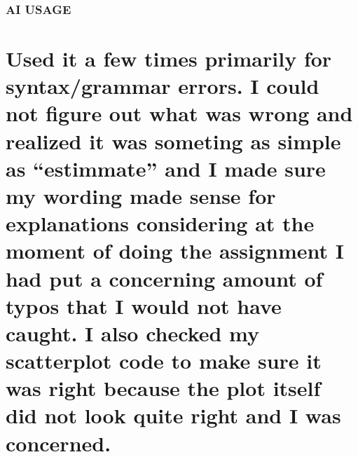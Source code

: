 \documentclass[
]{article}
\begin{document}
\subsubsection{AI USAGE}\label{ai-usage}

\section{Used it a few times primarily for syntax/grammar errors. I
could not figure out what was wrong and realized it was someting as
simple as ``estimmate'' and I made sure my wording made sense for
explanations considering at the moment of doing the assignment I had put
a concerning amount of typos that I would not have caught. I also
checked my scatterplot code to make sure it was right because the plot
itself did not look quite right and I was
concerned.}\label{used-it-a-few-times-primarily-for-syntaxgrammar-errors.-i-could-not-figure-out-what-was-wrong-and-realized-it-was-someting-as-simple-as-estimmate-and-i-made-sure-my-wording-made-sense-for-explanations-considering-at-the-moment-of-doing-the-assignment-i-had-put-a-concerning-amount-of-typos-that-i-would-not-have-caught.-i-also-checked-my-scatterplot-code-to-make-sure-it-was-right-because-the-plot-itself-did-not-look-quite-right-and-i-was-concerned.}
\end{document}
